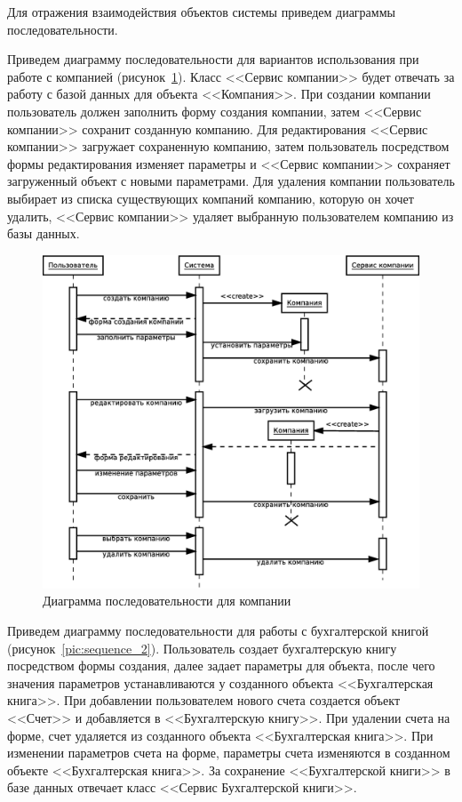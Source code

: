 \documentclass[14pt,a4paper]{reportmod}
\begin{document}
Для отражения взаимодействия объектов системы приведем диаграммы последовательности.

Приведем диаграмму последовательности для вариантов использования при работе с компанией (рисунок~\ref{pic:sequence_1}).  Класс <<Сервис компании>> будет отвечать за работу с базой данных для объекта <<Компания>>. При создании компании пользователь должен заполнить форму создания компании, затем <<Сервис компании>> сохранит созданную компанию. Для редактирования <<Сервис компании>> загружает сохраненную компанию, затем пользователь посредством формы редактирования изменяет параметры и <<Сервис компании>> сохраняет загруженный объект с новыми параметрами. Для удаления компании пользователь выбирает из списка существующих компаний компанию, которую он хочет удалить, <<Сервис компании>> удаляет выбранную пользователем компанию из базы данных.

\begin{figure}
  \centering
  \includegraphics[scale=0.4]{uml/_sequence_4}
  \caption{Диаграмма последовательности для компании}
  \label{pic:sequence_1}
\end{figure}

Приведем диаграмму последовательности для работы с бухгалтерской книгой (рисунок~\ref{pic:sequence_2}). Пользователь создает бухгалтерскую книгу посредством формы создания, далее задает параметры для объекта, после чего значения параметров устанавливаются у созданного объекта <<Бухгалтерская книга>>. При добавлении пользователем нового счета создается объект <<Счет>> и добавляется в <<Бухгалтерскую книгу>>. При удалении счета на форме, счет удаляется из созданного объекта <<Бухгалтерская книга>>. При изменении параметров счета на форме, параметры счета изменяются в созданном объекте <<Бухгалтерская книга>>. За сохранение <<Бухгалтерской книги>> в базе данных отвечает класс <<Сервис Бухгалтерской книги>>.
\end{document}
